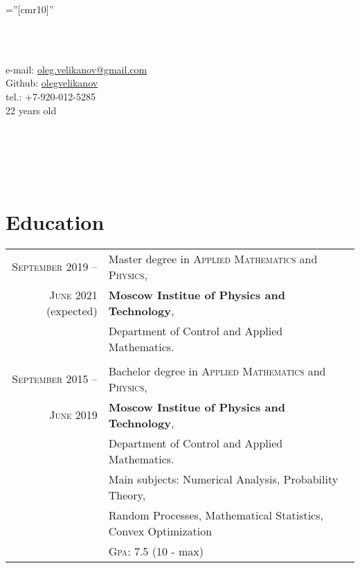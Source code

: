 \documentclass[a4paper,10pt]{article}
\begin{document}
\pagestyle{empty}                           %

\font\fb=''[cmr10]''                        %

\par{
    \par
}



\begin{center}

    \\\

    e-mail: \href{mailto:oleg.velikanov@gmail.com}{oleg.velikanov@gmail.com} \\
    Github: \href{https://github.com/olegvelikanov}{olegvelikanov} \\
    tel.: +7-920-012-5285\\
    22 years old\\
     
     \\\
     
     \\\
    \hfill 
\end{center}

\section{Education}
\begin{tabular}{rl}
    \textsc{September}  2019 -- 
    & Master degree in \textsc{Applied Mathematics} and \textsc{Physics},\\
    \textsc{June}  2021 (expected)
    &\normalsize\textbf{Moscow Institue of Physics and Technology},\\
    &Department of Control and Applied Mathematics.\\
    
    \\
    
    \textsc{September}  2015 -- 
    & Bachelor degree in \textsc{Applied Mathematics} and \textsc{Physics},\\
    \textsc{June}  2019
    &\normalsize\textbf{Moscow Institue of Physics and Technology},\\
    &Department of Control and Applied Mathematics.\\
    &Main subjects: Numerical Analysis, Probability Theory,\\ 
    &Random Processes, Mathematical Statistics, Convex Optimization \\ \bigskip
    &\normalsize \textsc{Gpa}: 7.5 (10 - max)\\  
\end{tabular}
\end{document}
